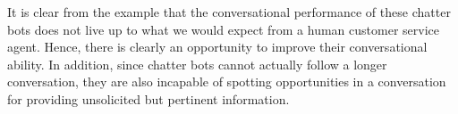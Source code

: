 It is clear from the example that the conversational performance of these chatter bots does not live up to what we would expect from a human customer service agent. Hence, there is clearly an opportunity to improve their conversational ability. In addition, since chatter bots cannot actually follow a longer conversation, they are also incapable of spotting opportunities in a conversation for providing unsolicited but pertinent information.
% 
% 

